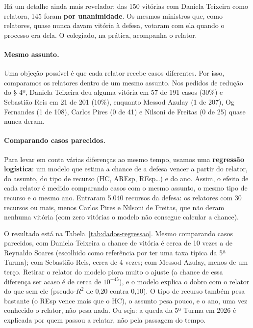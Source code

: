 Há um detalhe ainda mais revelador: das 150 vitórias com Daniela Teixeira como relatora, 145
foram \textbf{por unanimidade}. Os mesmos ministros que, como relatores, quase nunca davam
vitória à defesa, votaram com ela quando o processo era dela. O colegiado, na prática,
acompanha o relator.

\paragraph*{Mesmo assunto.} Uma objeção possível é que cada relator recebe casos diferentes.
Por isso, comparamos os relatores dentro de um mesmo assunto. Nos pedidos de redução do § 4º,
Daniela Teixeira deu alguma vitória em 57 de 191 casos (30\%) e Sebastião Reis em 21 de 201
(10\%), enquanto Messod Azulay (1 de 207), Og Fernandes (1 de 108), Carlos Pires (0 de 41) e
Nilsoni de Freitas (0 de 25) quase nunca deram.

\paragraph*{Comparando casos parecidos.} Para levar em conta várias diferenças ao mesmo tempo,
usamos uma \textbf{regressão logística}: um modelo que estima a chance de a defesa vencer a
partir do relator, do assunto, do tipo de recurso (HC, AREsp, REsp\ldots) e do ano. Assim, o
efeito de cada relator é medido comparando casos com o mesmo assunto, o mesmo tipo de recurso
e o mesmo ano. Entraram 5.040 recursos da defesa: os relatores com 30 recursos ou mais, menos
Carlos Pires e Nilsoni de Freitas, que não deram nenhuma vitória (com zero vitórias o modelo
não consegue calcular a chance).

O resultado está na Tabela~\ref{tab:dados-regressao}. Mesmo comparando casos parecidos, com
Daniela Teixeira a chance de vitória é cerca de 10 vezes a de Reynaldo Soares (escolhido
como referência por ter uma taxa típica da 5ª Turma); com Sebastião Reis, cerca de 4 vezes;
com Messod Azulay, menos de um terço. Retirar o relator do modelo piora muito o ajuste (a
chance de essa diferença ser acaso é de cerca de $10^{-45}$), e o modelo explica o dobro com o
relator do que sem ele (pseudo-$R^2$ de 0,20 contra 0,10). O tipo de recurso também pesa
bastante (o REsp vence mais que o HC), o assunto pesa pouco, e o ano, uma vez conhecido o
relator, não pesa nada. Ou seja: a queda da 5ª Turma em 2026 é explicada por quem passou a
relatar, não pela passagem do tempo.


